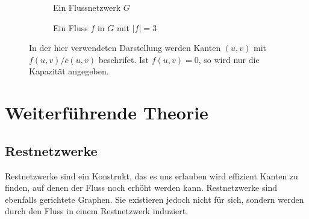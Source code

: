 \documentclass[12pt,a4paper,titlepage,onecolumn,ngerman]{scrartcl}
\begin{document}
\begin{figure}\label{fig:1}
    \centering
    \begin{subfigure}[t]{.475\textwidth}
        \centering
        \caption{Ein Flussnetzwerk $G$}
        \label{fig:1.1}
    \end{subfigure}
    \hfill
    \begin{subfigure}[t]{.475\textwidth}
        \centering
        \caption{Ein Fluss $f$ in $G$ mit $\lvert f\rvert = 3$}
        \label{fig:1.2}
    \end{subfigure}
    \caption{In der hier verwendeten Darstellung werden Kanten $(u,v)$ mit $f(u,v)/c(u,v)$ beschrifet. Ist $f(u,v) = 0$, so wird nur die Kapazität angegeben.}
\end{figure}

\section{Weiterführende Theorie}
\subsection{Restnetzwerke}
Restnetzwerke sind ein Konstrukt, das es uns erlauben wird effizient Kanten zu finden, auf denen der Fluss noch erhöht werden kann.
Restnetzwerke sind ebenfalls gerichtete Graphen. Sie existieren jedoch nicht für sich, sondern werden durch den Fluss in einem Restnetzwerk induziert.
\end{document}
